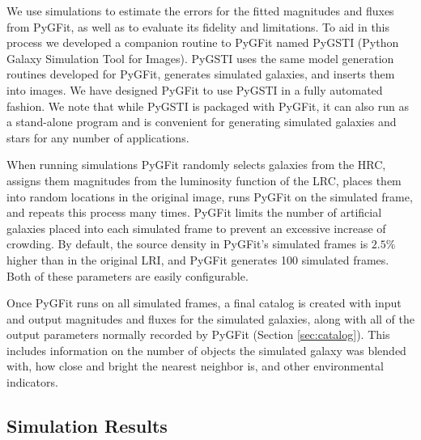 \documentclass[apj]{emulateapj}
\newcommand{\pygfit}{PyGFit}
\newcommand{\pygsti}{PyGSTI}
\begin{document}
We use simulations to estimate the errors for the fitted magnitudes and fluxes from \pygfit{}, as well as to evaluate its fidelity and limitations.  To aid in this process we developed a companion routine to \pygfit{} named \pygsti{} (Python Galaxy Simulation Tool for Images).  \pygsti{} uses the same model generation routines developed for \pygfit{}, generates simulated galaxies, and inserts them into images.  We have designed \pygfit{} to use \pygsti{} in a fully automated fashion.  We note that while \pygsti{} is packaged with \pygfit{}, it can also run as a stand-alone program and is convenient for generating simulated galaxies and stars for any number of applications.

When running simulations \pygfit{} randomly selects galaxies from the HRC, assigns them magnitudes from the luminosity function of the LRC, places them into random locations in the original image, runs \pygfit{} on the simulated frame, and repeats this process many times.  \pygfit{} limits the number of artificial galaxies placed into each simulated frame to prevent an excessive increase of crowding.  By default, the source density in \pygfit{}'s simulated frames is $2.5\%$ higher than in the original LRI, and \pygfit{} generates 100 simulated frames.  Both of these parameters are easily configurable.

Once \pygfit{} runs on all simulated frames, a final catalog is created with input and output magnitudes and fluxes for the simulated galaxies, along with all of the output parameters normally recorded by \pygfit{} (Section \ref{sec:catalog}).  This includes information on the number of objects the simulated galaxy was blended with, how close and bright the nearest neighbor is, and other environmental indicators.

\subsection{Simulation Results}

\begin{figure*}
\caption{(Top) Input magnitude versus input magnitude minus output magnitude as measured by \pygfit{} simulations for three filters: R (left), J (center), and $3.6\mu$m (right).  (Bottom) Magnitude error as a function of magnitude.  The solid circles show the error of \pygfit{}'s magnitude estimates in magnitude bins.  For comparison the open circles show the resulting error when a $4^{\prime\prime}$ diameter aperture-magnitude is used instead of \pygfit{}.  The solid line shows the uncertainty introduced by sky noise for an aperture with a $4^{\prime\prime}$ diameter.}\label{fig:mag_sims}
\end{figure*}
\end{document}
